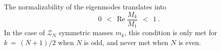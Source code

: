 \documentclass[epsfig,12pt]{article}
\def\beq{\begin{equation}}
\def\eeq{\end{equation}}
\def\beq{\begin{equation}}
\def\eeq{\end{equation}}
\newcommand{\mc}[1]{\mathcal{#1}}
\begin{document}
	The normalizability of the eigenmodes translates into
\beq
\label{norm}
	0 ~~<~~ \text{Re}\; \frac{ M_k }
                                 { M_1 } ~~<~~ 1\,.
\eeq
	In the case of $ \mc{Z}_N $ symmetric masses $ m_k $, this condition is only met for $ k \,=\, (N+1)/2 $
	when $ N $ is odd, and never met when $ N $ is even.


\end{document}
